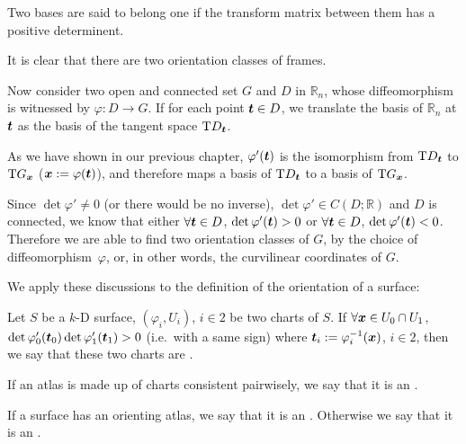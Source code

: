 \documentclass[openany]{book}
\begin{document}
\begin{definition}
	Two bases are said to belong one  if the transform matrix between them has a positive determinent.
\end{definition}

It is clear that there are two orientation classes of frames.

Now consider two open and connected set $G$ and $D$ in $\mathbb R_n$, whose diffeomorphism is witnessed by $\varphi \colon D \to G$. 
If for each point $\boldsymbol{t} \in D$, we translate the basis of $\mathbb R_n$ at $\boldsymbol{t}$ as the basis of the tangent space $\mathrm TD_{\boldsymbol{t}}$. 

As we have shown in our previous chapter, $\varphi'(\boldsymbol{t})$ is the isomorphism from $\mathrm TD_{\boldsymbol{t}}$ to $\mathrm TG_{\boldsymbol{x}}$ ($\boldsymbol{x} := \varphi(\boldsymbol{t})$), and therefore maps a basis of $\mathrm TD_{\boldsymbol{t}}$ to a basis of $\mathrm TG_{\boldsymbol{x}}$.

Since $\det \varphi' \neq 0$ (or there would be no inverse), $\det \varphi' \in C(D; \mathbb R) $ and $D$ is connected, we know that either $\forall \boldsymbol{t} \in D$, $\det \varphi'(\boldsymbol{t}) > 0$ or $\forall \boldsymbol{t} \in D$, $\det \varphi'(\boldsymbol{t}) < 0$. 
Therefore we are able to find two orientation classes of $G$, by the choice of diffeomorphism~$\varphi$, or, in other words, the curvilinear coordinates of $G$.

We apply these discussions to the definition of the orientation of a surface:

\begin{definition}
	Let $S$ be a $k$-D surface, $(\varphi_i, U_i)$, $i \in 2$ be two charts of $S$. 
	If $\forall \boldsymbol{x} \in U_0 \cap U_1$, $\det \varphi'_0(\boldsymbol{t}_0) \det \varphi'_1(\boldsymbol{t}_1) > 0$ (i.e.\ with a same sign) where $\boldsymbol{t}_i := \varphi^{-1}_i(\boldsymbol{x})$, $i \in 2$, then we say that these two charts are .
\end{definition}

\begin{definition}
	If an atlas is made up of charts consistent pairwisely, we say that it is an .

	If a surface has an orienting atlas, we say that it is an . 
	Otherwise we say that it is an .
\end{definition}
\end{document}
